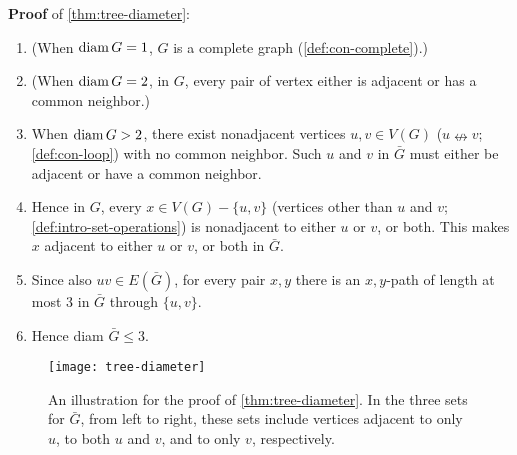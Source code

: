 \documentclass[../src/handouts/main.tex]{subfiles}
\begin{document}
\textbf{Proof} of \cref{thm:tree-diameter}:
\begin{enumerate}
  \item (When $\operatorname*{diam} G = 1$, $G$ is a complete graph (\cref{def:con-complete}).)
  \item (When $\operatorname*{diam} G = 2$, in $G$, every pair of vertex either is adjacent or has a common neighbor.)
  \item When $\operatorname*{diam} G > 2$, there exist nonadjacent vertices $u, v \in V(G)$ ($u \nleftrightarrow v$; \cref{def:con-loop}) with no common neighbor. Such $u$ and $v$ in $\bar{G}$ must either be adjacent or have a common neighbor.
  \item Hence in $G$, every $x \in V(G) - \{u, v\}$ (vertices other than $u$ and $v$; \cref{def:intro-set-operations}) is nonadjacent to either $u$ or $v$, or both. This makes $x$ adjacent to either $u$ or $v$, or both in $\bar{G}$.
  \item Since also $u v \in E(\bar{G})$, for every pair $x, y$ there is an $x, y$-path of length at most 3 in $\bar{G}$ through $\{u, v\}$.
  \item Hence diam $\bar{G} \leq 3$.
\end{enumerate}

\begin{figure}[htbp]
  \centering
  \texttt{[image: tree-diameter]}
  \caption{An illustration for the proof of \cref{thm:tree-diameter}. In the three sets for $\bar{G}$, from left to right, these sets include vertices adjacent to only $u$, to both $u$ and $v$, and to only $v$, respectively.}
  \label{fig:tree-diameter}
\end{figure}
\end{document}
